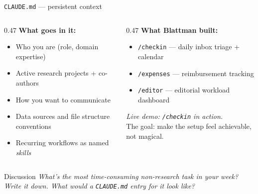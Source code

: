 \documentclass[aspectratio=169, 10pt]{beamer}
\newcommand{\discussprompt}[1]{%
  \begin{alertblock}{\faComments\quad Discussion}
    \textit{#1}
  \end{alertblock}
}
\begin{document}
\begin{frame}{\texttt{CLAUDE.md} --- persistent context}
  \begin{columns}[T]
    \begin{column}{0.47\textwidth}
      \textbf{What goes in it:}
      \begin{itemize}
        \item Who you are (role, domain expertise)
        \item Active research projects + co-authors
        \item How you want to communicate
        \item Data sources and file structure conventions
        \item Recurring workflows as named \textit{skills}
      \end{itemize}
    \end{column}
    \begin{column}{0.47\textwidth}
      \textbf{What Blattman built:}
      \begin{itemize}
        \item \texttt{/checkin} --- daily inbox triage + calendar
        \item \texttt{/expenses} --- reimbursement tracking
        \item \texttt{/editor} --- editorial workload dashboard
      \end{itemize}
      \vspace{0.5em}
      \small\color{black!60}
      \textit{Live demo: \texttt{/checkin} in action.}\\
      The goal: make the setup feel achievable, not magical.
    \end{column}
  \end{columns}
  \vfill
  \discussprompt{What's the most time-consuming non-research task in your week?
  Write it down. What would a \texttt{CLAUDE.md} entry for it look like?}
\end{frame}
\end{document}
